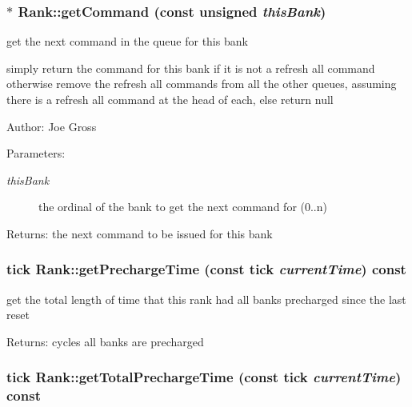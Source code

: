 \subsubsection[{getCommand}]{ $\ast$ Rank::getCommand (const unsigned {\em thisBank})}\label{class_d_r_a_msim_i_i_1_1_rank_213753498fc0af7dea14cbfa5e53e3df}


get the next command in the queue for this bank 

simply return the command for this bank if it is not a refresh all command otherwise remove the refresh all commands from all the other queues, assuming there is a refresh all command at the head of each, else return null \begin{Desc}
\item[Author:]Joe Gross \end{Desc}
\begin{Desc}
\item[Parameters:]
\begin{description}
\item[{\em thisBank}]the ordinal of the bank to get the next command for (0..n) \end{description}
\end{Desc}
\begin{Desc}
\item[Returns:]the next command to be issued for this bank \end{Desc}
\subsubsection[{getPrechargeTime}]{\setlength{\rightskip}{0pt plus 5cm}tick Rank::getPrechargeTime (const tick {\em currentTime}) const}\label{class_d_r_a_msim_i_i_1_1_rank_6826601315567089a09b6a53023672d9}


get the total length of time that this rank had all banks precharged since the last reset 

\begin{Desc}
\item[Returns:]cycles all banks are precharged \end{Desc}
\subsubsection[{getTotalPrechargeTime}]{\setlength{\rightskip}{0pt plus 5cm}tick Rank::getTotalPrechargeTime (const tick {\em currentTime}) const}\label{class_d_r_a_msim_i_i_1_1_rank_cedcb11333dd8281488e440ffc6a8711}


